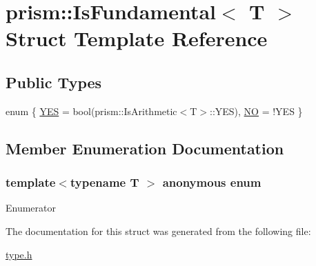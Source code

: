\hypertarget{structprism_1_1_is_fundamental}{}\section{prism\+:\+:Is\+Fundamental$<$ T $>$ Struct Template Reference}
\label{structprism_1_1_is_fundamental}
\subsection*{Public Types}
\begin{DoxyCompactItemize}
\item 
enum \{ \hyperlink{structprism_1_1_is_fundamental_a19331dbca101a4efbc30a72f39919ae7a8958d086c892ef94c6834fb9587b9b6e}{Y\+ES} = bool(prism\+:\+:Is\+Arithmetic$<$T$>$\+:\+:Y\+ES), 
\hyperlink{structprism_1_1_is_fundamental_a19331dbca101a4efbc30a72f39919ae7a03ac6ed5589f388b76eefe3f473c4244}{NO} = !\+Y\+ES
 \}
\end{DoxyCompactItemize}


\subsection{Member Enumeration Documentation}
\subsubsection[{\texorpdfstring{anonymous enum}{anonymous enum}}]{\setlength{\rightskip}{0pt plus 5cm}template$<$typename T $>$ anonymous enum}\hypertarget{structprism_1_1_is_fundamental_a19331dbca101a4efbc30a72f39919ae7}{}\label{structprism_1_1_is_fundamental_a19331dbca101a4efbc30a72f39919ae7}
\begin{Desc}
\item[Enumerator]\par
\begin{description}
\item[{\em 
Y\+ES\hypertarget{structprism_1_1_is_fundamental_a19331dbca101a4efbc30a72f39919ae7a8958d086c892ef94c6834fb9587b9b6e}{}\label{structprism_1_1_is_fundamental_a19331dbca101a4efbc30a72f39919ae7a8958d086c892ef94c6834fb9587b9b6e}
}]\item[{\em 
NO\hypertarget{structprism_1_1_is_fundamental_a19331dbca101a4efbc30a72f39919ae7a03ac6ed5589f388b76eefe3f473c4244}{}\label{structprism_1_1_is_fundamental_a19331dbca101a4efbc30a72f39919ae7a03ac6ed5589f388b76eefe3f473c4244}
}]\end{description}
\end{Desc}


The documentation for this struct was generated from the following file\+:\begin{DoxyCompactItemize}
\item 
\hyperlink{type_8h}{type.\+h}\end{DoxyCompactItemize}
